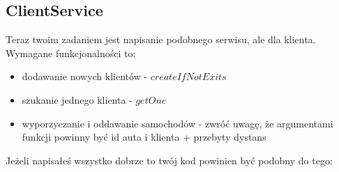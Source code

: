 \documentclass{article}
\begin{document}
        \subsection{ClientService}
        Teraz twoim zadaniem jest napisanie podobnego serwisu, ale dla klienta. Wymagane funkcjonalności to:
        \begin{itemize}
            \item dodawanie nowych klientów - $createIfNotExits$
            \item szukanie jednego klienta - $getOne$
            \item wyporzyczanie i oddawanie samochodów - zwróć uwagę, że argumentami funkcji powinny być id auta i klienta + przebyty dystans
        \end{itemize}
        Jeżeli napisałeś wszystko dobrze to twój kod powinien być podobny do tego:
\end{document}

